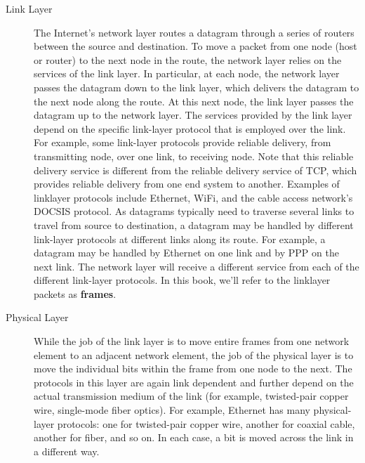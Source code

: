 \documentclass{article}
\begin{document}
\begin{description}
\begin{description}
        \item[Link Layer] The Internet’s network layer routes a datagram through a series of routers between
        the source and destination. To move a packet from one node (host or router) to the
        next node in the route, the network layer relies on the services of the link layer. In
        particular, at each node, the network layer passes the datagram down to the link
        layer, which delivers the datagram to the next node along the route. At this next
        node, the link layer passes the datagram up to the network layer.
        The services provided by the link layer depend on the specific link-layer protocol
        that is employed over the link. For example, some link-layer protocols provide
        reliable delivery, from transmitting node, over one link, to receiving node. Note that
        this reliable delivery service is different from the reliable delivery service of TCP,
        which provides reliable delivery from one end system to another. Examples of linklayer
        protocols include Ethernet, WiFi, and the cable access network’s DOCSIS protocol.
        As datagrams typically need to traverse several links to travel from source to
        destination, a datagram may be handled by different link-layer protocols at different
        links along its route. For example, a datagram may be handled by Ethernet on one
        link and by PPP on the next link. The network layer will receive a different service
        from each of the different link-layer protocols. In this book, we’ll refer to the linklayer
        packets as {\bf frames}.
        
        \item[Physical Layer] While the job of the link layer is to move entire frames from one network element
        to an adjacent network element, the job of the physical layer is to move the individual
        bits within the frame from one node to the next. The protocols in this layer are
        again link dependent and further depend on the actual transmission medium of the
        link (for example, twisted-pair copper wire, single-mode fiber optics). For example,
        Ethernet has many physical-layer protocols: one for twisted-pair copper wire,
        another for coaxial cable, another for fiber, and so on. In each case, a bit is moved
        across the link in a different way.
    \end{description}
    

\end{description}
\end{document}
